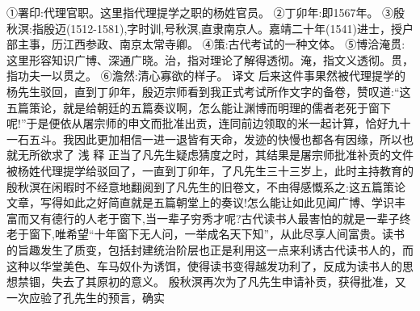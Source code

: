 \documentclass[12pt,UTF8]{ctexbook}
\begin{document}
①署印:代理官职。这里指代理提学之职的杨姓官员。
②丁卯年:即1567年。
③殷秋溟:指殷迈(1512-1581),字时训,号秋溟,直隶南京人。嘉靖二十年(1541)进士，授户部主事，历江西参政、南京太常寺卿。
④策:古代考试的一种文体。
⑤博洽淹贯:这里形容知识广博、深通广晓。治，指对理论了解得透彻。淹，指文义透彻。贯，指功夫一以贯之。
⑥澹然:清心寡欲的样子。
译文
后来这件事果然被代理提学的杨先生驳回，直到丁卯年，殷迈宗师看到我正式考试所作文字的备卷，赞叹道:“这五篇策论，就是给朝廷的五篇奏议啊，怎么能让渊博而明理的儒者老死于窗下呢!”于是便依从屠宗师的申文而批准出贡，连同前边领取的米一起计算，恰好九十一石五斗。我因此更加相信一进一退皆有天命，发迹的快慢也都各有因缘，所以也就无所欲求了
浅 释
正当了凡先生疑虑猜度之时，其结果是屠宗师批准补贡的文件被杨姓代理提学给驳回了，一直到丁卯年，了凡先生三十三岁上，此时主持教育的殷秋溟在闲暇时不经意地翻阅到了凡先生的旧卷文，不由得感慨系之:这五篇策论文章，写得如此之好简直就是五篇朝堂上的奏议!怎么能让如此见闻广博、学识丰富而又有德行的人老于窗下,当一辈子穷秀才呢?古代读书人最害怕的就是一辈子终老于窗下,唯希望“十年窗下无人问，一举成名天下知”，从此尽享人间富贵。读书的旨趣发生了质变，包括封建统治阶层也正是利用这一点来利诱古代读书人的，而这种以华堂美色、车马奴仆为诱饵，使得读书变得越发功利了，反成为读书人的思想禁锢，失去了其原初的意义。
殷秋溟再次为了凡先生申请补贡，获得批准，又一次应验了孔先生的预言，确实
\end{document}
